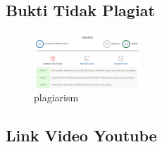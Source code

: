 \subsection{Bukti Tidak Plagiat}
\begin{figure}[H]
	\includegraphics[width=4cm]{figures/1174076/figures8/plagiarism.png}
	\centering
	\caption{plagiarism}
\end{figure}


\subsection{Link Video Youtube}
